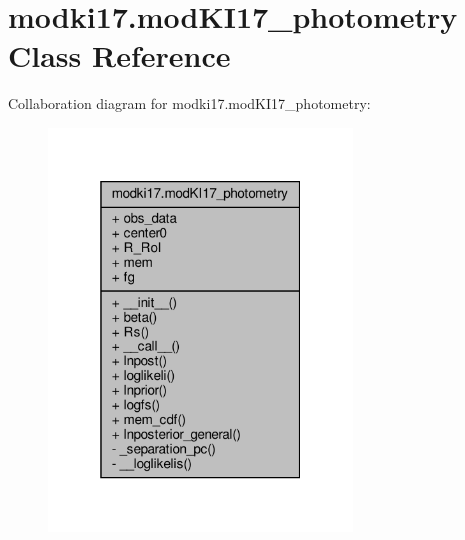 \hypertarget{classmodki17_1_1modKI17__photometry}{}\section{modki17.\+mod\+K\+I17\+\_\+photometry Class Reference}
\label{classmodki17_1_1modKI17__photometry}


Collaboration diagram for modki17.\+mod\+K\+I17\+\_\+photometry\+:\nopagebreak
\begin{figure}[H]
\begin{center}
\leavevmode
\includegraphics[width=229pt]{d3/d59/classmodki17_1_1modKI17__photometry__coll__graph}
\end{center}
\end{figure}
